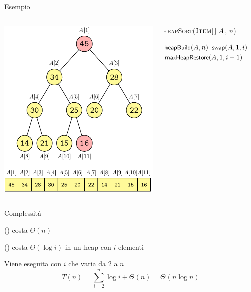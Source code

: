 \begin{frame}{Esempio}
\begin{columns}[T]
\begin{overprint}
\includegraphics[width=\textwidth,page=21]{heapsort.pdf}
\end{overprint}
\vspace{-9pt}
\begin{Procedure}
\caption[A]{\textsc{heapSort}($\textsc{Item}[\,]\ A$, \INTEGER $n$)}
$\textsf{{\small heapBuild}}(A, n)$\;
{
  \alert<1,5,7,9,11,13,15,17,19>{$\textsf{{\small swap}}(A,1,i)$}\;
  \alert<2-4,6,8,10,12,14,16,18,20>{$\textsf{{\small maxHeapRestore}}(A, 1, i-1)$}\;
}
\end{Procedure}
\end{columns}
\end{frame}

\begin{frame}{Complessità}

\vspace{-9pt}
\begin{myboxtitle}[Complessità]
\BI
\item \heapbuild() costa $\Theta(n)$
\item \maxheapify() costa $\Theta(\log i)$ in un
heap con $i$ elementi
\item Viene eseguita con $i$ che varia da $2$ a $n$
\EI
\[
T(n) = \sum_{i=2}^n \log i + \Theta(n) = \Theta(n \log n)
\]
\end{myboxtitle}

\end{frame}

